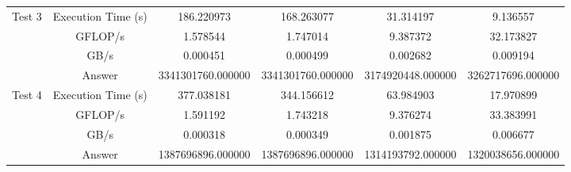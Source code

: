 \documentclass[10pt,a4paper]{article}
\begin{document}
\begin{adjustbox}{center}
\begin{tabular}{|c|c||c|c|c|c|}
\multirow{4}{*}{Test 3} & \multicolumn{1}{c||}{Execution Time (s)} & \multicolumn{1}{c|}{186.220973} 
															       & \multicolumn{1}{c|}{168.263077} 
															       & \multicolumn{1}{c|}{31.314197}
															       & \multicolumn{1}{c|}{9.136557} \\\cline{2-6}
					    & \multicolumn{1}{c||}{GFLOP/s} & \multicolumn{1}{c|}{1.578544} 
					    								& \multicolumn{1}{c|}{1.747014} 
					    								& \multicolumn{1}{c|}{9.387372}
					    								& \multicolumn{1}{c|}{32.173827} \\\cline{2-6}
					    & \multicolumn{1}{c||}{GB/s} & \multicolumn{1}{c|}{0.000451} 
					    							 & \multicolumn{1}{c|}{0.000499} 
					    							 & \multicolumn{1}{c|}{0.002682}
					    							 & \multicolumn{1}{c|}{0.009194} \\\cline{2-6}
   					    & \multicolumn{1}{c||}{Answer} & \multicolumn{1}{c|}{3341301760.000000} 
   					    							   & \multicolumn{1}{c|}{3341301760.000000} 
   					    							   & \multicolumn{1}{c|}{3174920448.000000}
   					    							   & \multicolumn{1}{c|}{3262717696.000000} \\\cline{2-6} \hline
   			
\multirow{4}{*}{Test 4} & \multicolumn{1}{c||}{Execution Time (s)} & \multicolumn{1}{c|}{377.038181} 
															       & \multicolumn{1}{c|}{344.156612} 
															       & \multicolumn{1}{c|}{63.984903}
															       & \multicolumn{1}{c|}{17.970899} \\\cline{2-6}
					    & \multicolumn{1}{c||}{GFLOP/s} & \multicolumn{1}{c|}{1.591192} 
					    								& \multicolumn{1}{c|}{1.743218} 
					    								& \multicolumn{1}{c|}{9.376274}
					    								& \multicolumn{1}{c|}{33.383991} \\\cline{2-6}
					    & \multicolumn{1}{c||}{GB/s} & \multicolumn{1}{c|}{0.000318} 
					    							 & \multicolumn{1}{c|}{0.000349} 
					    							 & \multicolumn{1}{c|}{0.001875}
					    							 & \multicolumn{1}{c|}{0.006677} \\\cline{2-6}
   					    & \multicolumn{1}{c||}{Answer} & \multicolumn{1}{c|}{1387696896.000000} 
   					    							   & \multicolumn{1}{c|}{1387696896.000000} 
   					    							   & \multicolumn{1}{c|}{1314193792.000000}
   					    							   & \multicolumn{1}{c|}{1320038656.000000} \\\cline{2-6} \hline
   			

\end{tabular}
\end{adjustbox}
\end{document}
